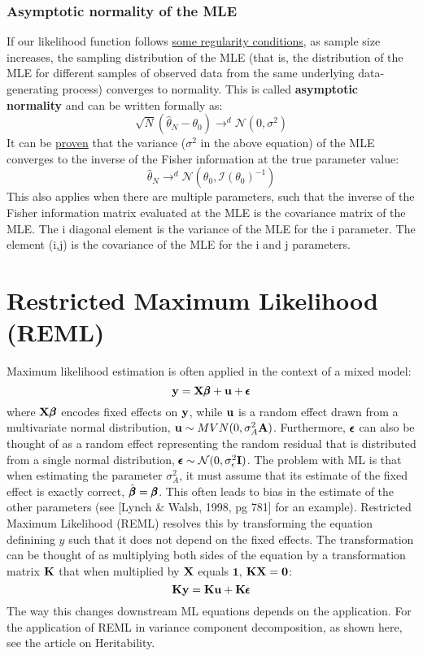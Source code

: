 \documentclass[12pt]{article}
\begin{document}
\subsubsection{Asymptotic normality of the MLE}
If our likelihood function follows \href{https://en.wikipedia.org/wiki/Fisher_information#Regularity_conditions}{some regularity conditions}, as sample size increases, the sampling distribution of the MLE (that is, the distribution of the MLE for different samples of observed data from the same underlying data-generating process) converges to normality. This is called \textbf{asymptotic normality} and can be written formally as:
$$
\sqrt{N}
(\hat{\theta}_N - \theta_0)
\rightarrow^d
\mathcal{N}(0, \sigma^2)
$$
It can be \href{https://gregorygundersen.com/blog/2019/11/28/asymptotic-normality-mle/}{proven} that the variance ($\sigma^2$ in the above equation) of the MLE converges to the inverse of the Fisher information at the true parameter value:
$$
\hat{\theta}_N
\rightarrow^d
\mathcal{N}(\theta_0, \mathcal{I}(\theta_0)^{-1})
$$
This also applies when there are multiple parameters, such that the inverse of the Fisher information matrix evaluated at the MLE is the covariance matrix of the MLE.
The i diagonal element is the variance of the MLE for the i parameter.
The element (i,j) is the covariance of the MLE for the i and j parameters.

\section{Restricted Maximum Likelihood (REML)}
Maximum likelihood estimation is often applied in the context of a mixed model:
$$
\mathbf{y} = \mathbf{X} \pmb{\beta} + \mathbf{u} + \pmb{\epsilon}
$$
where $\mathbf{X} \pmb{\beta}$ encodes fixed effects on $\mathbf{y}$, while $\mathbf{u}$ is a random effect drawn from a multivariate normal distribution, $\mathbf{u} \sim MVN(0, \sigma_A^2 \mathbf{A})$. Furthermore, $\pmb{\epsilon}$ can also be thought of as a random effect representing the random residual that is distributed from a single normal distribution, $\pmb{\epsilon} \sim \mathcal{N}(0, \sigma_{\epsilon}^2 \mathbf{I})$. The problem with ML is that when estimating the parameter $\sigma_A^2$, it must assume that its estimate of the fixed effect is exactly correct, $\hat{\pmb{\beta}} = \pmb{\beta}$. This often leads to bias in the estimate of the other parameters (see [Lynch \& Walsh, 1998, pg 781] for an example). Restricted Maximum Likelihood (REML) resolves this by transforming the equation definining $y$ such that it does not depend on the fixed effects. The transformation can be thought of as multiplying both sides of the equation by a transformation matrix $\mathbf{K}$ that when multiplied by $\mathbf{X}$ equals $\textbf{1}$, $\mathbf{K} \mathbf{X} = \textbf{0}$:
$$
\mathbf{K} \mathbf{y} = \mathbf{K} \mathbf{u} + \mathbf{K} \pmb{\epsilon}
$$
The way this changes downstream ML equations depends on the application. For the application of REML in variance component decomposition, as shown here, see the article on Heritability.
\end{document}
